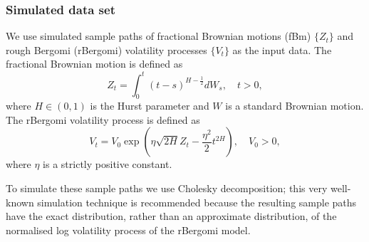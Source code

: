 \documentclass[]{article}
\renewcommand{\(}{\left(}
\renewcommand{\)}{\right)}
\begin{document}
	\subsubsection{Simulated data set}
	We use simulated sample paths of fractional Brownian motions (fBm) $\{Z_t\}$ and rough Bergomi (rBergomi) volatility processes $\{V_t\}$ as the input data. 
	The fractional Brownian motion is defined as 
	\begin{equation}
		Z_t = \int_{0}^{t} (t-s)^{H-\frac{1}{2}} dW_s,\quad t>0,
	\end{equation}
	where $H\in(0,1)$ is the Hurst parameter and $W$ is a standard Brownian motion.
	The rBergomi volatility process is defined as
	\begin{equation}
		V_t = V_0 \exp \left(\eta\sqrt{2H}Z_t - \frac{\eta^2}{2} t^{2H}\right),\quad V_0>0,
	\end{equation}
	where $\eta$ is a strictly positive constant.
	
	To simulate these sample paths we use Cholesky decomposition; this very well-known simulation technique is recommended because the resulting sample paths have the exact distribution, rather than an approximate distribution, of the normalised log volatility process of the rBergomi model.
\end{document}
